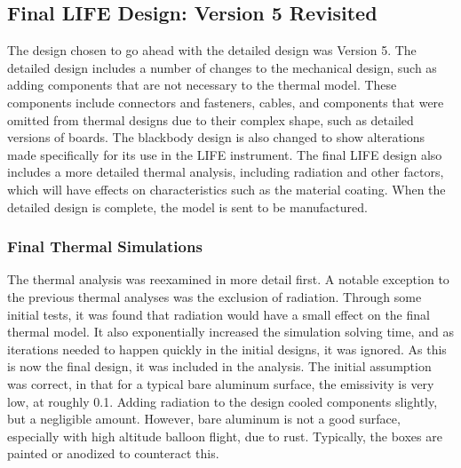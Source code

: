 \subsection{Final LIFE Design: Version 5 Revisited}
The design chosen to go ahead with the detailed design was Version 5. The detailed design includes a number of changes to the mechanical design, such as adding components that are not necessary to the thermal model. These components include connectors and fasteners, cables, and components that were omitted from thermal designs due to their complex shape, such as detailed versions of boards. The blackbody design is also changed to show alterations made specifically for its use in the LIFE instrument. The final LIFE design also includes a more detailed thermal analysis, including radiation and other factors, which will have effects on characteristics such as the material coating. When the detailed design is complete, the model is sent to be manufactured.

\subsubsection{Final Thermal Simulations}

The thermal analysis was reexamined in more detail first. A notable exception to the previous thermal analyses was the exclusion of radiation. Through some initial tests, it was found that radiation would have a small effect on the final thermal model. It also exponentially increased the simulation solving time, and as iterations needed to happen quickly in the initial designs, it was ignored. As this is now the final design, it was included in the analysis. The initial assumption was correct, in that for a typical bare aluminum surface, the emissivity is very low, at roughly 0.1. Adding radiation to the design cooled components slightly, but a negligible amount. However, bare aluminum is not a good surface, especially with high altitude balloon flight, due to rust. Typically, the boxes are painted or anodized to counteract this.

